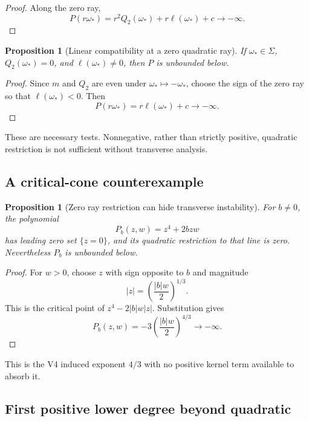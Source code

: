 \documentclass[11pt]{article}
\newtheorem{proposition}[theorem]{Proposition}
\theoremstyle{remark}
\begin{document}
\begin{proof}
Along the zero ray,
\[
 P(r\omega_*)
 =
 r^2Q_2(\omega_*)+r\ell(\omega_*)+c
 \longrightarrow-\infty.                           \tag{7.15}
\]
\end{proof}

\begin{proposition}[Linear compatibility at a zero quadratic ray]
\label{prop:v17v7-linear}
If \(\omega_*\in\Sigma\), \(Q_2(\omega_*)=0\), and
\(\ell(\omega_*)\ne0\), then \(P\) is unbounded below.
\end{proposition}

\begin{proof}
Since \(m\) and \(Q_2\) are even under
\(\omega_*\mapsto-\omega_*\), choose the sign of the zero ray so that
\(\ell(\omega_*)<0\).  Then
\[
 P(r\omega_*)=r\ell(\omega_*)+c\to-\infty.
\]
\end{proof}

These are necessary tests.  Nonnegative, rather than strictly
positive, quadratic restriction is not sufficient without
transverse analysis.

\subsection{A critical-cone counterexample}

\begin{proposition}[Zero ray restriction can hide transverse
instability]
\label{prop:v17v7-critical-counter}
For \(b\ne0\), the polynomial
\[
 P_b(z,w)=z^4+2bzw                               \tag{7.16}
\]
has leading zero set \(\{z=0\}\), and its quadratic restriction to
that line is zero.  Nevertheless \(P_b\) is unbounded below.
\end{proposition}

\begin{proof}
For \(w>0\), choose \(z\) with sign opposite to \(b\) and magnitude
\[
 |z|=\left(\frac{|b|w}{2}\right)^{1/3}.             \tag{7.17}
\]
This is the critical point of \(z^4-2|b|w|z|\).
Substitution gives
\[
 P_b(z,w)
 =
 -3\left(\frac{|b|w}{2}\right)^{4/3}
 \longrightarrow-\infty.                           \tag{7.18}
\]
\end{proof}

This is the V4 induced exponent \(4/3\) with no positive kernel term
available to absorb it.

\subsection{First positive lower degree beyond quadratic}
\end{document}
